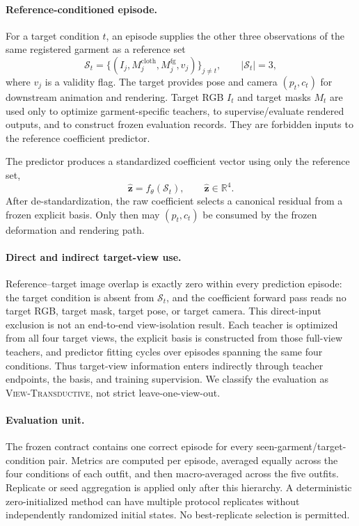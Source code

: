 \paragraph{Reference-conditioned episode.}
For a target condition $t$, an episode supplies the other three observations of the same registered garment as a reference set
\begin{equation}
\mathcal{S}_t=\{(I_j,M_j^{\mathrm{cloth}},M_j^{\mathrm{fg}},v_j)\}_{j\neq t},
\qquad |\mathcal{S}_t|=3,
\end{equation}
where $v_j$ is a validity flag. The target provides pose and camera $(p_t,c_t)$ for downstream animation and rendering. Target RGB $I_t$ and target masks $M_t$ are used only to optimize garment-specific teachers, to supervise/evaluate rendered outputs, and to construct frozen evaluation records. They are forbidden inputs to the reference coefficient predictor.

The predictor produces a standardized coefficient vector using only the reference set,
\begin{equation}
\hat{\mathbf z}=f_{\theta}(\mathcal{S}_t), \qquad \hat{\mathbf z}\in\mathbb{R}^{4}.
\end{equation}
After de-standardization, the raw coefficient selects a canonical residual from a frozen explicit basis. Only then may $(p_t,c_t)$ be consumed by the frozen deformation and rendering path.

\paragraph{Direct and indirect target-view use.}
Reference--target image overlap is exactly zero within every prediction episode: the target condition is absent from $\mathcal{S}_t$, and the coefficient forward pass reads no target RGB, target mask, target pose, or target camera. This direct-input exclusion is not an end-to-end view-isolation result. Each teacher is optimized from all four target views, the explicit basis is constructed from those full-view teachers, and predictor fitting cycles over episodes spanning the same four conditions. Thus target-view information enters indirectly through teacher endpoints, the basis, and training supervision. We classify the evaluation as \textsc{View-Transductive}, not strict leave-one-view-out.

\paragraph{Evaluation unit.}
The frozen contract contains one correct episode for every seen-garment/target-condition pair. Metrics are computed per episode, averaged equally across the four conditions of each outfit, and then macro-averaged across the five outfits. Replicate or seed aggregation is applied only after this hierarchy. A deterministic zero-initialized method can have multiple protocol replicates without independently randomized initial states. No best-replicate selection is permitted.

